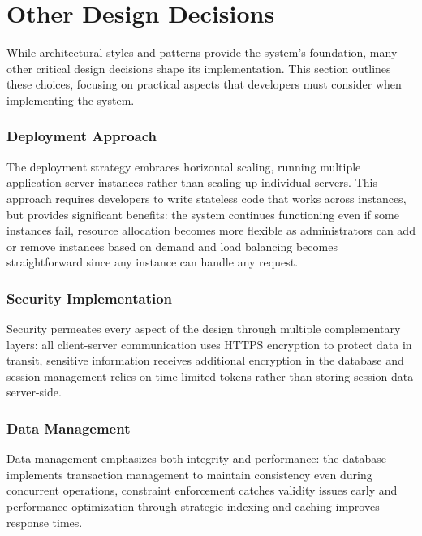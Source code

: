 \section{Other Design Decisions}
While architectural styles and patterns provide the system's foundation, many other critical design decisions shape its implementation.
This section outlines these choices, focusing on practical aspects that developers must consider when implementing the system.

\subsubsection{Deployment Approach}
The deployment strategy embraces horizontal scaling, running multiple application server instances rather than scaling up individual servers.
This approach requires developers to write stateless code that works across instances, but provides significant benefits: the system continues functioning even if some instances fail, resource allocation becomes more flexible as administrators can add or remove instances based on demand and load balancing becomes straightforward since any instance can handle any request.

\subsubsection{Security Implementation}
Security permeates every aspect of the design through multiple complementary layers: all client-server communication uses HTTPS encryption to protect data in transit, sensitive information receives additional encryption in the database and session management relies on time-limited tokens rather than storing session data server-side.

\subsubsection{Data Management}
Data management emphasizes both integrity and performance: the database implements transaction management to maintain consistency even during concurrent operations, constraint enforcement catches validity issues early and performance optimization through strategic indexing and caching improves response times.

